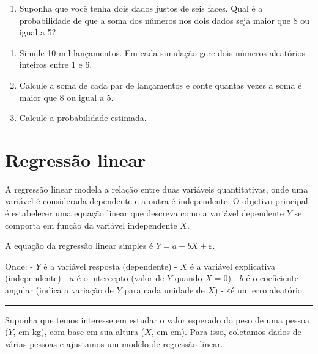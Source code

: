 \documentclass[
]{book}
\providecommand{\tightlist}{%
  \setlength{\itemsep}{0pt}\setlength{\parskip}{0pt}}
\begin{document}
\begin{enumerate}
\def\labelenumi{\arabic{enumi}.}
\setcounter{enumi}{2}
\tightlist
\item
  Suponha que você tenha dois dados justos de seis faces. Qual é a probabilidade de que a soma dos números nos dois dados seja maior que 8 ou igual a 5?
\end{enumerate}

\begin{enumerate}
\def\labelenumi{(\alph{enumi})}
\tightlist
\item
  Simule 10 mil lançamentos. Em cada simulação gere dois números aleatórios inteiros entre 1 e 6.
\item
  Calcule a soma de cada par de lançamentos e conte quantas vezes a soma é maior que 8 ou igual a 5.
\item
  Calcule a probabilidade estimada.
\end{enumerate}

\chapter{Regressão linear}\label{regressuxe3o-linear}

A regressão linear modela a relação entre duas variáveis quantitativas, onde uma variável é considerada dependente e a outra é independente. O objetivo principal é estabelecer uma equação linear que descreva como a variável dependente \(Y\) se comporta em função da variável independente \(X\).

A equação da regressão linear simples é \(Y = a + b X + \varepsilon\).

Onde:
- \(Y\) é a variável resposta (dependente)
- \(X\) é a variável explicativa (independente)
- \(a\) é o intercepto (valor de \(Y\) quando \(X = 0\))
- \(b\) é o coeficiente angular (indica a variação de \(Y\) para cada unidade de \(X\))
- \(\varepsilon\)é um erro aleatório.

\begin{center}\rule{0.5\linewidth}{0.5pt}\end{center}

Suponha que temos interesse em estudar o valor esperado do peso de uma pessoa (\(Y\), em kg), com base em sua altura (\(X\), em cm). Para isso, coletamos dados de várias pessoas e ajustamos um modelo de regressão linear.
\end{document}
